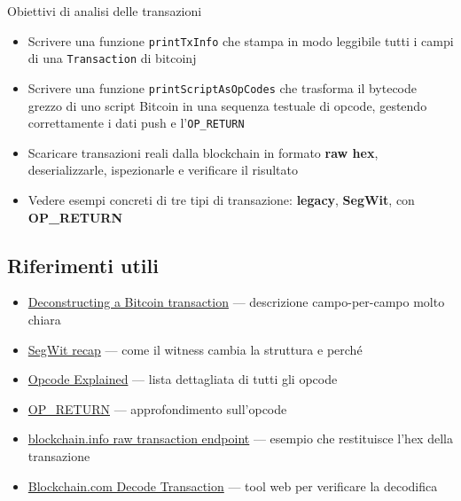 \documentclass[
  italian,
  openany]{book}
\providecommand{\tightlist}{%
  \setlength{\itemsep}{0pt}\setlength{\parskip}{0pt}}
\begin{document}
\begin{calloutnote}{Obiettivi di analisi delle transazioni}

\begin{itemize}
\tightlist
\item
  Scrivere una funzione \texttt{printTxInfo} che stampa in modo
  leggibile tutti i campi di una \texttt{Transaction} di bitcoinj
\item
  Scrivere una funzione \texttt{printScriptAsOpCodes} che trasforma il
  bytecode grezzo di uno script Bitcoin in una sequenza testuale di
  opcode, gestendo correttamente i dati push e l'\texttt{OP\_RETURN}
\item
  Scaricare transazioni reali dalla blockchain in formato \textbf{raw
  hex}, deserializzarle, ispezionarle e verificare il risultato
\item
  Vedere esempi concreti di tre tipi di transazione: \textbf{legacy},
  \textbf{SegWit}, con \textbf{OP\_RETURN}
\end{itemize}

\end{calloutnote}

\subsection{Riferimenti utili}\label{riferimenti-utili}

\begin{itemize}
\tightlist
\item
  \href{https://dev.to/thunderbiscuit/deconstructing-a-bitcoin-transaction-4l2n}{Deconstructing
  a Bitcoin transaction} --- descrizione campo-per-campo molto chiara
\item
  \href{https://learnmeabitcoin.com/technical/upgrades/segregated-witness/}{SegWit
  recap} --- come il witness cambia la struttura e perché
\item
  \href{https://opcodeexplained.com/opcodes/}{Opcode Explained} ---
  lista dettagliata di tutti gli opcode
\item
  \href{https://learnmeabitcoin.com/technical/script/return/}{OP\_RETURN}
  --- approfondimento sull'opcode
\item
  \href{https://blockchain.info/rawtx/a637ad18fabee7ad3ccd51e317091a6e16991311c0c9b83233b140b66b114448?format=hex}{blockchain.info
  raw transaction endpoint} --- esempio che restituisce l'hex della
  transazione
\item
  \href{https://www.blockchain.com/explorer/assets/btc/decode-transaction}{Blockchain.com
  Decode Transaction} --- tool web per verificare la decodifica
\end{itemize}
\end{document}
